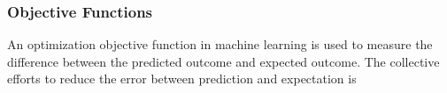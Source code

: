 \subsubsection{Objective Functions}
An optimization objective function in machine learning is used to measure the difference between the predicted outcome and expected outcome. The collective efforts to reduce the error between prediction and expectation is 